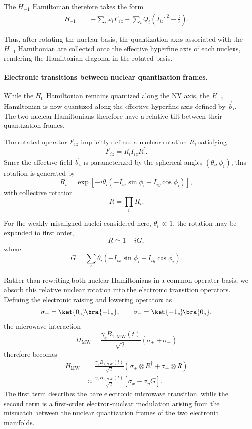 The $H_{-1}$ Hamiltonian therefore takes the form
\begin{align}
H_{-1}
&=
-\sum_i\omega_i I'_{iz}
+
\sum_iQ_i\!\left(I_{iz}'^{\,2}-\tfrac23\right).
\label{eq:H-1_rot}
\end{align}

Thus, after rotating the nuclear basis, the quantization axes associated with the $H_{-1}$ Hamiltonian are collected onto the effective hyperfine axis of each nucleus, rendering the Hamiltonian diagonal in the rotated basis.\\

\paragraph{Electronic transitions between nuclear quantization frames.}

While the $H_0$ Hamiltonian remains quantized along the NV axis, the $H_{-1}$ Hamiltonian is now quantized along the effective hyperfine axis defined by $\vec b_i$. The two nuclear Hamiltonians therefore have a relative tilt between their quantization frames.

The rotated operator \(I'_{iz}\) implicitly defines a nuclear rotation
\(R_i\) satisfying
\[
I'_{iz}=R_i I_{iz} R_i^\dagger.
\]
Since the effective field \(\vec b_i\) is parameterized by the spherical angles \((\theta_i,\phi_i)\), this rotation is generated by
\[
R_i
=
\exp\!\left[
-i\theta_i
\left(
-I_{ix}\sin\phi_i
+
I_{iy}\cos\phi_i
\right)
\right],
\]
with collective rotation
\[
R=\prod_iR_i.
\]

For the weakly misaligned nuclei considered here,  \(\theta_i\ll1\), the rotation may be expanded to first order,
\[
R
\simeq
1-iG,
\]
where
\[
G
=
\sum_i\theta_i
\left(
-I_{ix}\sin\phi_i
+
I_{iy}\cos\phi_i
\right).
\]

Rather than rewriting both nuclear Hamiltonians in a common operator basis, we absorb this relative nuclear rotation into the electronic transition operators. Defining the electronic raising and lowering operators as
\[
\sigma_+
=
\ket{0_e}\!\bra{-1_e},
\qquad
\sigma_-
=
\ket{-1_e}\!\bra{0_e},
\]
the microwave interaction
\[
H_{\mathrm{MW}}
=
\frac{\gamma_eB_{1,\mathrm{MW}}(t)}{\sqrt2}
(\sigma_+ + \sigma_-)
\]
therefore becomes
\begin{equation}
\begin{aligned}
H_{\mathrm{MW}}
&=
\frac{\gamma_eB_{1,\mathrm{MW}}(t)}{\sqrt2}
\left(
\sigma_+\otimes R^\dagger
+
\sigma_-\otimes R
\right)
\\
&\approx
\frac{\gamma_eB_{1,\mathrm{MW}}(t)}{\sqrt2}
\left[
\sigma_x
-
\sigma_y G
\right].
\end{aligned}
\label{eq:HMW_rot}
\end{equation}
The first term describes the bare electronic microwave transition, while the second term is a first-order electron-nuclear modulation arising from the mismatch between the nuclear quantization frames of the two electronic manifolds.\\



